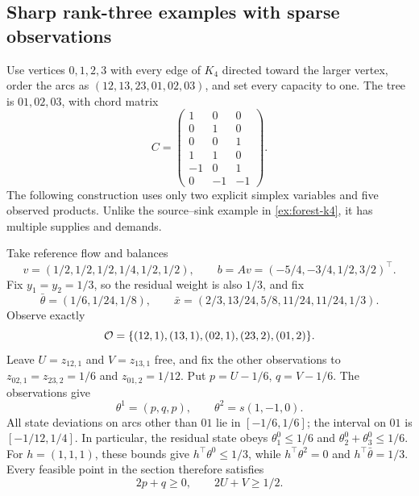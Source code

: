 \subsection{Sharp rank-three examples with sparse observations}\label{subsec:sharp-k4}
Use vertices $0,1,2,3$ with every edge of $K_4$ directed toward the larger
vertex, order the arcs as $(12,13,23,01,02,03)$, and set every capacity
to one. The tree is $01,02,03$, with chord matrix
\begin{equation}\label{eq:sharp-k4-matrix}
 C=\begin{pmatrix}
 1&0&0\\0&1&0\\0&0&1\\1&1&0\\-1&0&1\\0&-1&-1
 \end{pmatrix}.
\end{equation}
The following construction uses only two explicit simplex variables and
five observed products. Unlike the source--sink example in
\cref{ex:forest-k4}, it has multiple supplies and demands.

Take reference flow and balances
\begin{equation}\label{eq:sharp-k4-balances}
 v=(1/2,1/2,1/2,1/4,1/2,1/2),\qquad
 b=Av=(-5/4,-3/4,1/2,3/2)^\top.
\end{equation}
Fix $y_1=y_2=1/3$, so the residual weight is also $1/3$, and fix
\begin{equation}\label{eq:sharp-k4-aggregate}
 \bar\theta=(1/6,1/24,1/8),\qquad
 \bar x=(2/3,13/24,5/8,11/24,11/24,1/3).
\end{equation}
Observe exactly
\begin{equation}\label{eq:sharp-k4-observations}
 \mathcal O=\{(12,1),(13,1),(02,1),(23,2),(01,2)\}.
\end{equation}
Leave $U=z_{12,1}$ and $V=z_{13,1}$ free, and fix the other observations
to $z_{02,1}=z_{23,2}=1/6$ and $z_{01,2}=1/12$. Put
$p=U-1/6$, $q=V-1/6$. The observations give
\begin{equation}\label{eq:sharp-k4-states}
 \theta^1=(p,q,p),\qquad \theta^2=s(1,-1,0).
\end{equation}
All state deviations on arcs other than $01$ lie in $[-1/6,1/6]$;
the interval on $01$ is $[-1/12,1/4]$. In particular, the residual
state obeys $\theta^0_1\le1/6$ and
$\theta^0_2+\theta^0_3\le1/6$. For $h=(1,1,1)$, these bounds give
$h^\top\theta^0\le1/3$, while $h^\top\theta^2=0$ and
$h^\top\bar\theta=1/3$. Every feasible point in the section therefore
satisfies
\begin{equation}\label{eq:sharp-k4-cut}
                    2p+q\ge0,\qquad 2U+V\ge1/2.
\end{equation}


